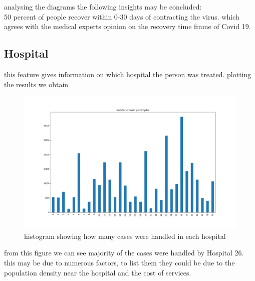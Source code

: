 \documentclass[fleqn]{article}
\begin{document}
			analysing the diagrams the following insights may be concluded: \\
			50 percent of people recover within 0-30 days of contracting the virus.
			which agrees with the medical experts opinion on the recovery time frame 			of Covid 19.
			
		\newpage
		\subsection*{Hospital}
			this feature gives information on which hospital the person was treated.
			plotting the results we obtain \\ 
			\begin{figure}[hb]
  				\includegraphics[width=\linewidth]{hospital_hist.png}
  				\caption{histogram showing how many cases were handled in each 							hospital}
  				\label{fig:3}
			\end{figure} 
			\FloatBarrier
			from this figure we can see majority of the cases were handled by 						Hospital 26. this may be due to numerous factors, to list them they 					could be due to the population density near the hospital and the cost of 			services.
		
		\newpage
\end{document}
